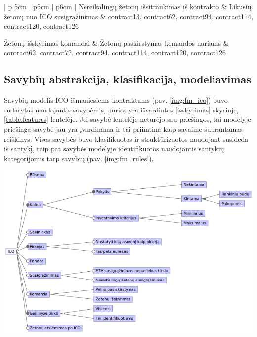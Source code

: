 \documentclass{VUMIFPSkursinis}
\begin{document}
\begin{center}
\begin{longtable}[H]{| p {5cm} | p{5cm} | p{6cm} |}
	Nereikalingų žetonų išsitraukimas iš kontrakto  & Likusių žetonų nuo ICO susigrąžinimas  & contract13, contract62, contract94, contract114, contract120, contract126 \\ 
	\hline
	
	Žetonų išskyrimas komandai & Žetonų paskirstymas komandos nariams  &  contract62, contract72, contract94, contract114, contract120, contract126\\ 
	\hline

    \end{longtable}

    \label{table:features}

\end{center}



\subsection{Savybių abstrakcija, klasifikacija, modeliavimas} \label{modelis}

Savybių modelis ICO išmaniesiems kontraktams (pav. \ref{img:fm_ico}) buvo sudarytas naudojantis savybėmis, kurios yra išvardintos \ref{isskyrimas} skyriuje, \ref{table:features} lentelėje. Jei savybė lentelėje neturėjo sau priešingos, tai modelyje priešinga savybė jau yra įvardinama ir tai priimtina kaip savaime suprantamas reiškinys. Visos savybės buvo klasifikuotos ir struktūrizuotos naudojant susideda iš santykį, taip pat savybės modelyje identifikuotos naudojantis santykių kategorijomis tarp savybių (pav. \ref{img:fm_rules}).


\begin{center}
    \includegraphics[scale=0.65]{img/ico_model}
    \label{img:fm_ico}
\end{center}
\end{document}
